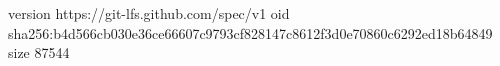 version https://git-lfs.github.com/spec/v1
oid sha256:b4d566cb030e36ce66607c9793cf828147c8612f3d0e70860c6292ed18b64849
size 87544
